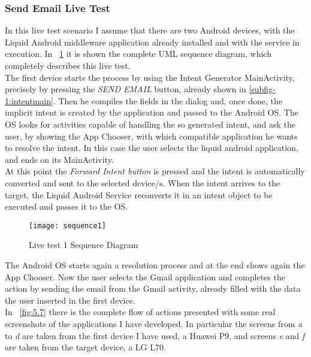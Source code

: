 \subsubsection{Send Email Live Test}
In this live test scenario I assume that there are two Android devices, with the Liquid Android middleware application already installed and with the service in execution.
In \figurename~\ref{fig:5.6} it is shown the complete UML sequence diagram, which completely describes this live test.\\
The first device starts the process by using the Intent Generator MainActivity, precisely by pressing the \textit{SEND EMAIL} button, already shown in \ref{subfig-1:intentmain}. Then he compiles the fields in the dialog and, once done, the implicit intent is created by the application and passed to the Android OS. The OS looks for activities capable of handling the so generated intent, and ask the user, by showing the App Chooser, with which compatible application he wants to resolve the intent. In this case the user selects the liquid android application, and ends on its MainActivity.\\
At this point the \textit{Forward Intent button} is pressed and the intent is automatically converted and sent to the selected device/s. When the intent arrives to the target, the Liquid Android Service reconverts it in an intent object to be executed and passes it to the OS.
\begin{figure}[h]
	\centering
	\texttt{[image: sequence1]}
	\caption{Live test 1 Sequence Diagram}
	\label{fig:5.6}
\end{figure}
The Android OS starts again a resolution process and at the end shows again the App Chooser. Now the user selects the Gmail application and completes the action by sending the email from the Gmail activity, already filled with the data the user inserted in the first device.\\
In \figurename~\ref{fig:5.7} there is the complete flow of actions presented with some real screenshots of the applications I have developed. In particular the screens from \textit{a} to \textit{d} are taken from the first device I have used, a Huawei P9, and screens \textit{e} and \textit{f} are taken from the target device, a LG L70.

